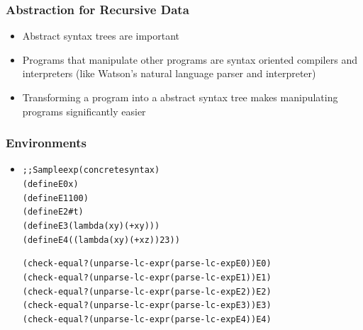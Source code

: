 \documentclass{beamer}
\newcommand{\quot}{\texttt{\textquotesingle{}}}
\begin{document}
\begin{frame}[fragile]
\frametitle{Abstraction for Recursive Data}
\begin{scriptsize}
\begin{itemize}
\item<1-> Abstract syntax trees are important

\item<1-> Programs that manipulate other programs are syntax oriented
compilers and interpreters (like Watson’s natural language parser and interpreter)

\item<1-> Transforming a program into a abstract syntax tree makes manipulating programs significantly easier
\end{itemize}
\end{scriptsize}
\end{frame}

\begin{frame}[fragile]
\frametitle{Environments}
\begin{scriptsize}
\begin{itemize}
\item<1->
\begin{alltt}
;; Sample exp (concrete syntax)
(define E0 \quot{}x)
(define E1 100)
(define E2 \#t)
(define E3 \quot{}(lambda (x y) (+ x y)))
(define E4 \quot{}((lambda (x y) (+ x z)) 2 3))

(check-equal? (unparse-lc-expr (parse-lc-exp E0)) E0)
(check-equal? (unparse-lc-expr (parse-lc-exp E1)) E1)
(check-equal? (unparse-lc-expr (parse-lc-exp E2)) E2)
(check-equal? (unparse-lc-expr (parse-lc-exp E3)) E3)
(check-equal? (unparse-lc-expr (parse-lc-exp E4)) E4)
\end{alltt}

\end{itemize}
\end{scriptsize}
\end{frame}
\end{document}
